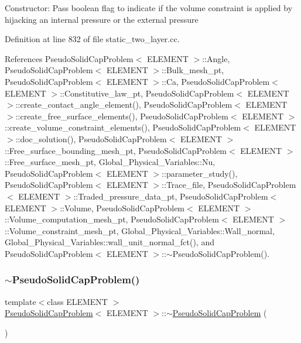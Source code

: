 Constructor\+: Pass boolean flag to indicate if the volume constraint is applied by hijacking an internal pressure or the external pressure 

Definition at line 832 of file static\+\_\+two\+\_\+layer.\+cc.



References Pseudo\+Solid\+Cap\+Problem$<$ E\+L\+E\+M\+E\+N\+T $>$\+::\+Angle, Pseudo\+Solid\+Cap\+Problem$<$ E\+L\+E\+M\+E\+N\+T $>$\+::\+Bulk\+\_\+mesh\+\_\+pt, Pseudo\+Solid\+Cap\+Problem$<$ E\+L\+E\+M\+E\+N\+T $>$\+::\+Ca, Pseudo\+Solid\+Cap\+Problem$<$ E\+L\+E\+M\+E\+N\+T $>$\+::\+Constitutive\+\_\+law\+\_\+pt, Pseudo\+Solid\+Cap\+Problem$<$ E\+L\+E\+M\+E\+N\+T $>$\+::create\+\_\+contact\+\_\+angle\+\_\+element(), Pseudo\+Solid\+Cap\+Problem$<$ E\+L\+E\+M\+E\+N\+T $>$\+::create\+\_\+free\+\_\+surface\+\_\+elements(), Pseudo\+Solid\+Cap\+Problem$<$ E\+L\+E\+M\+E\+N\+T $>$\+::create\+\_\+volume\+\_\+constraint\+\_\+elements(), Pseudo\+Solid\+Cap\+Problem$<$ E\+L\+E\+M\+E\+N\+T $>$\+::doc\+\_\+solution(), Pseudo\+Solid\+Cap\+Problem$<$ E\+L\+E\+M\+E\+N\+T $>$\+::\+Free\+\_\+surface\+\_\+bounding\+\_\+mesh\+\_\+pt, Pseudo\+Solid\+Cap\+Problem$<$ E\+L\+E\+M\+E\+N\+T $>$\+::\+Free\+\_\+surface\+\_\+mesh\+\_\+pt, Global\+\_\+\+Physical\+\_\+\+Variables\+::\+Nu, Pseudo\+Solid\+Cap\+Problem$<$ E\+L\+E\+M\+E\+N\+T $>$\+::parameter\+\_\+study(), Pseudo\+Solid\+Cap\+Problem$<$ E\+L\+E\+M\+E\+N\+T $>$\+::\+Trace\+\_\+file, Pseudo\+Solid\+Cap\+Problem$<$ E\+L\+E\+M\+E\+N\+T $>$\+::\+Traded\+\_\+pressure\+\_\+data\+\_\+pt, Pseudo\+Solid\+Cap\+Problem$<$ E\+L\+E\+M\+E\+N\+T $>$\+::\+Volume, Pseudo\+Solid\+Cap\+Problem$<$ E\+L\+E\+M\+E\+N\+T $>$\+::\+Volume\+\_\+computation\+\_\+mesh\+\_\+pt, Pseudo\+Solid\+Cap\+Problem$<$ E\+L\+E\+M\+E\+N\+T $>$\+::\+Volume\+\_\+constraint\+\_\+mesh\+\_\+pt, Global\+\_\+\+Physical\+\_\+\+Variables\+::\+Wall\+\_\+normal, Global\+\_\+\+Physical\+\_\+\+Variables\+::wall\+\_\+unit\+\_\+normal\+\_\+fct(), and Pseudo\+Solid\+Cap\+Problem$<$ E\+L\+E\+M\+E\+N\+T $>$\+::$\sim$\+Pseudo\+Solid\+Cap\+Problem().

\mbox{\label{classPseudoSolidCapProblem_aec2a79e44dfd785b2978419210b053b8}} 
\subsubsection{\texorpdfstring{$\sim$\+Pseudo\+Solid\+Cap\+Problem()}{~PseudoSolidCapProblem()}\hspace{0.1cm}{\footnotesize\ttfamily [2/2]}}
{\footnotesize\ttfamily template$<$class E\+L\+E\+M\+E\+NT $>$ \\
\hyperlink{classPseudoSolidCapProblem}{Pseudo\+Solid\+Cap\+Problem}$<$ E\+L\+E\+M\+E\+NT $>$\+::$\sim$\hyperlink{classPseudoSolidCapProblem}{Pseudo\+Solid\+Cap\+Problem} (\begin{DoxyParamCaption}{ }\end{DoxyParamCaption})}



